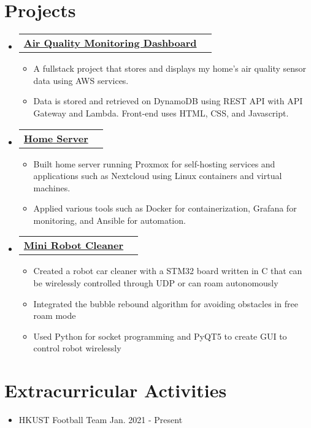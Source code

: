 \documentclass[letterpaper,12pt]{article}
\makeatletter
\newcommand{\resumeItem}[1]{
  \item\small{
    {#1 \vspace{-2pt}}
  }
}
\newcommand{\resumeProjectHeading}[2]{
    \item
    \begin{tabular*}{0.97\textwidth}{l@{\extracolsep{\fill}}r}
      \small#1 & #2 \\
    \end{tabular*}\vspace{-7pt}
}
\newcommand{\resumeSubHeadingListStart}{\begin{itemize}[leftmargin=0.05in, label={}]}
\newcommand{\resumeSubHeadingListEnd}{\end{itemize}}
\newcommand{\resumeItemListStart}{\begin{itemize}}
\newcommand{\resumeItemListEnd}{\end{itemize}\vspace{-5pt}}
\makeatother
\begin{document}
\section{Projects}
    \resumeSubHeadingListStart
      

    \resumeProjectHeading
    {\textbf{\href{https://airqualitydashboard.jyylab.com/}{ {Air Quality Monitoring Dashboard}}}    \emph{}}{}
    \resumeItemListStart
      \resumeItem{\normalsize{A fullstack project that stores and displays my home's air quality sensor data using AWS services.}} 
      \resumeItem{\normalsize{Data is stored and retrieved on DynamoDB using REST API with API Gateway and Lambda. Front-end uses HTML, CSS, and Javascript.}}
    \resumeItemListEnd

      \resumeProjectHeading
      {\textbf{\href{https://github.com/jamesyoung-15/homeserver}{ {Home Server}}} \emph{}}{}
      \resumeItemListStart
        \resumeItem{\normalsize{Built home server running Proxmox for self-hosting services and applications such as Nextcloud using Linux containers and virtual machines.}}
        \resumeItem{\normalsize{Applied various tools such as Docker for containerization, Grafana for monitoring, and Ansible for automation.}}
      \resumeItemListEnd

    \resumeProjectHeading
    {\textbf{\href{https://github.com/jamesyoung-15/Mini-Robot-Cleaner}{ {Mini Robot Cleaner}}}    \emph{}}{}
    \resumeItemListStart
      \resumeItem{\normalsize{Created a robot car cleaner with a STM32 board written in C that can be wirelessly controlled through UDP or can roam autonomously}} 
      \resumeItem{\normalsize{Integrated the bubble rebound algorithm for avoiding obstacles in free roam mode}}
      \resumeItem{\normalsize{Used Python for socket programming and PyQT5 to create GUI to control robot wirelessly}}
    \resumeItemListEnd



    \resumeSubHeadingListEnd




\section{Extracurricular Activities}
    \begin{itemize}[itemsep=-2pt, parsep=5pt] 
        \item  {HKUST Football Team \hfill Jan. 2021 - Present}
    \end{itemize}
\end{document}
